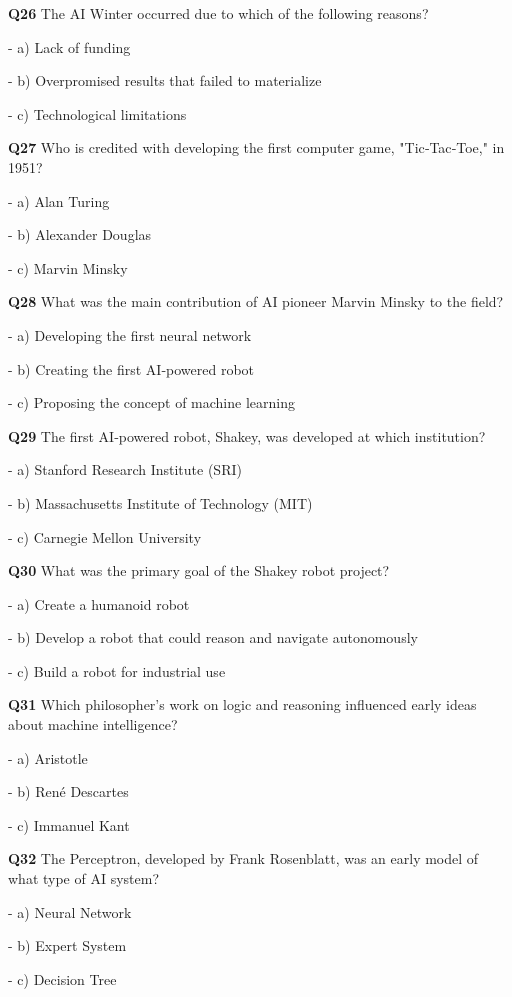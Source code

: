 \textbf{Q26} The AI Winter occurred due to which of the following reasons?\par
\quad - a) Lack of funding\par
\quad - b) Overpromised results that failed to materialize\par
\quad - c) Technological limitations\par

\textbf{Q27} Who is credited with developing the first computer game, "Tic‑Tac‑Toe," in 1951?\par
\quad - a) Alan Turing\par
\quad - b) Alexander Douglas\par
\quad - c) Marvin Minsky\par

\textbf{Q28} What was the main contribution of AI pioneer Marvin Minsky to the field?\par
\quad - a) Developing the first neural network\par
\quad - b) Creating the first AI‑powered robot\par
\quad - c) Proposing the concept of machine learning\par

\textbf{Q29} The first AI‑powered robot, Shakey, was developed at which institution?\par
\quad - a) Stanford Research Institute (SRI)\par
\quad - b) Massachusetts Institute of Technology (MIT)\par
\quad - c) Carnegie Mellon University\par

\textbf{Q30} What was the primary goal of the Shakey robot project?\par
\quad - a) Create a humanoid robot\par
\quad - b) Develop a robot that could reason and navigate autonomously\par
\quad - c) Build a robot for industrial use\par

\textbf{Q31} Which philosopher's work on logic and reasoning influenced early ideas about machine intelligence?\par
\quad - a) Aristotle\par
\quad - b) René Descartes\par
\quad - c) Immanuel Kant\par

\textbf{Q32} The Perceptron, developed by Frank Rosenblatt, was an early model of what type of AI system?\par
\quad - a) Neural Network\par
\quad - b) Expert System\par
\quad - c) Decision Tree\par

